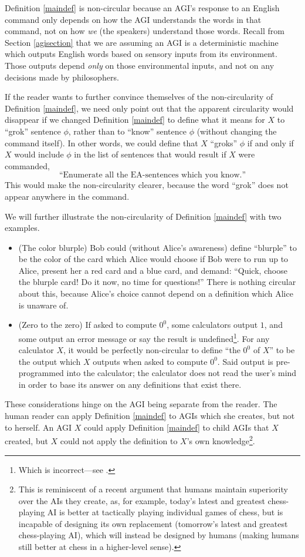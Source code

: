 \documentclass[runningheads]{llncs}
\begin{document}
Definition \ref{maindef} is non-circular because an AGI's response to an English
command only depends on how the AGI understands the words in that command, not
on how \emph{we} (the speakers) understand those words.
Recall from Section \ref{agisection}
that we are assuming an AGI is a deterministic machine which outputs English words
based on sensory inputs from its environment. Those outputs depend \emph{only} on those
environmental inputs, and not on any decisions made by philosophers.

If the reader wants to further convince themselves of the non-circularity of Definition
\ref{maindef}, we need only point out that the apparent circularity would disappear if
we changed Definition \ref{maindef} to define what it means for $X$ to ``grok'' sentence
$\phi$, rather than to ``know'' sentence $\phi$ (without changing the command itself).
In other words, we could define that $X$ ``groks'' $\phi$ if and only if $X$ would include
$\phi$ in the list of sentences that would result if $X$ were commanded,
  \[
  \text{``Enumerate all the EA-sentences which you know.''}
  \]
This would make the non-circularity clearer, because the word ``grok'' does not appear
anywhere in the command.

We will further illustrate the non-circularity of
Definition \ref{maindef} with two examples.
\begin{itemize}
  \item
  (The color blurple) Bob could (without Alice's awareness) define ``blurple'' to be the
  color of the card
  which Alice would choose if Bob were to run up to Alice, present her a red card
  and a blue card, and demand: ``Quick, choose the blurple card! Do it now, no time
  for questions!'' There is nothing circular about this, because Alice's choice
  cannot depend on a definition which Alice is unaware of.
  \item
  (Zero to the zero) If asked to compute $0^0$, some calculators output $1$, and some
  output an error message or say the result is undefined\footnote{Which is incorrect---see
  \cite{knuth}.}. For any calculator $X$, it
  would be perfectly non-circular to define ``the $0^0$ of $X$'' to be the output which
  $X$ outputs when asked to compute $0^0$. Said output is pre-programmed into the
  calculator; the calculator does not read the user's mind in order to base its answer
  on any definitions that exist there.
\end{itemize}

These considerations hinge on the AGI being separate from the reader.
The human reader can apply Definition \ref{maindef} to AGIs which she
creates, but not to herself. An AGI $X$ could apply Definition \ref{maindef} to child
AGIs that $X$ created, but $X$ could not apply the definition to $X$'s
own knowledge\footnote{This is reminiscent of a recent argument \cite{maguire2020people}
that humans maintain superiority over the AIs they create, as, for example,
today's latest and greatest chess-playing AI is better at tactically playing individual
games of chess, but is incapable of designing its own replacement (tomorrow's latest
and greatest chess-playing AI), which will instead be designed by humans (making humans
still better at chess in a higher-level sense).}.
\end{document}
